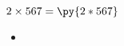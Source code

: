 \documentclass[paper=6.125in:9.25in,twoside,openright,pagesize=pdftex,10pt]{scrbook}
\newcommand{\pymultiply}[2]{\py{#1*#2}}
\begin{document}
$
2 \times 
567
= 
\pymultiply{2}{567}
$

\begin{itemize}
\item 
\end{itemize}
\end{document}
